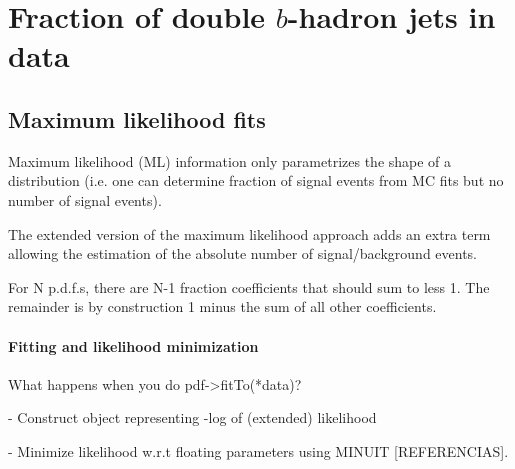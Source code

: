%
%
\chapter{Fraction of double $b$-hadron jets in data}\label{ch:gbbfraction}

\section{Maximum likelihood fits}%

Maximum likelihood (ML) information only parametrizes the shape of a 
distribution (i.e. one can determine fraction of signal events from 
MC fits but no number of signal events).

The extended version of the maximum likelihood approach adds an extra term
allowing the estimation of the absolute number of signal/background events.

For N p.d.f.s, there are N-1 fraction coefficients that should sum to less 1. The remainder is by construction 1 minus the sum of all other coefficients.





\subsubsection{Fitting and likelihood minimization}
What happens when you do pdf->fitTo(*data)?

- Construct object representing -log of (extended) likelihood

- Minimize likelihood w.r.t floating parameters using MINUIT [REFERENCIAS].


